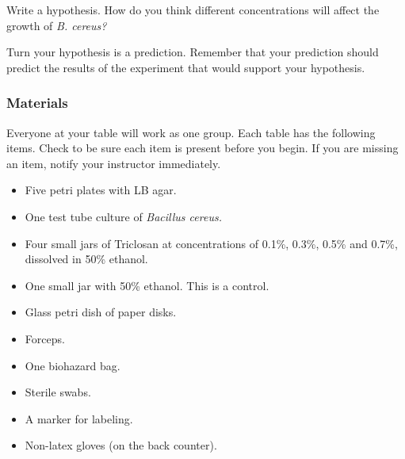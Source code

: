 \documentclass[12pt]{exam}
\begin{document}
\begin{questions}

\question \label{ques:hypothesis}
Write a hypothesis. How do you think different concentrations will affect the growth of \textit{B. cereus?}

\newpage

\question
Turn your hypothesis is a prediction. Remember that your prediction should predict the results of the experiment that would support your hypothesis. 

\vspace*{3\baselineskip}

\subsubsection*{Materials}

Everyone at your table will work as one group. Each table has the following items. Check to be sure each item is present before you begin. If you are missing an item, notify your instructor immediately.

\begin{itemize}

	\item Five petri plates with LB agar.
	
	\item One test tube culture of \textit{Bacillus cereus.}
	
	\item Four small jars of Triclosan at concentrations of 0.1\%, 0.3\%, 0.5\% and 0.7\%, dissolved in 50\% ethanol.
	
	\item One small jar with 50\% ethanol. This is a control.

	\item Glass petri dish of paper disks.
	
	\item Forceps.
	
	\item One biohazard bag.
	
	\item Sterile swabs.
	
	\item A marker for labeling.
	
	\item Non-latex gloves (on the back counter).
	
\end{itemize}


\end{questions}
\end{document}
